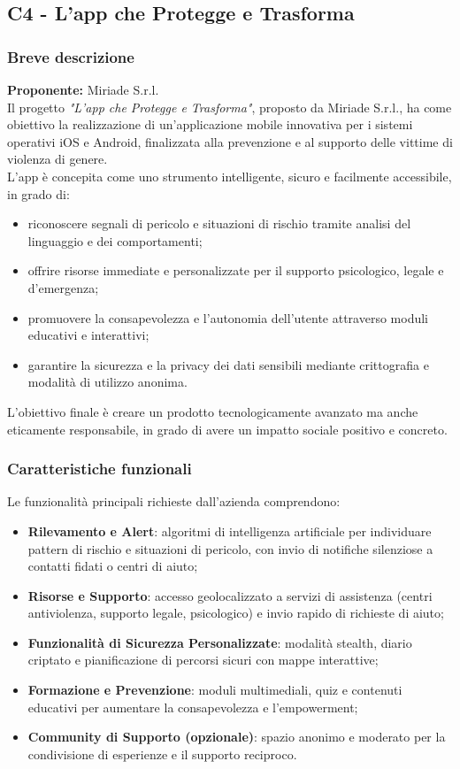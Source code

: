 \documentclass[a4paper,11pt]{article}
\begin{document}
\subsection{C4 - L'app che Protegge e Trasforma}
\subsubsection{Breve descrizione}
\textbf{Proponente:} Miriade S.r.l.
\vspace{0.5em}\\
Il progetto \textit{"L'app che Protegge e Trasforma"}, proposto da Miriade S.r.l., ha come obiettivo la realizzazione di un'applicazione mobile innovativa per i sistemi operativi iOS e Android, finalizzata alla prevenzione e al supporto delle vittime di violenza di genere.\\

L'app è concepita come uno strumento intelligente, sicuro e facilmente accessibile, in grado di:
\begin{itemize}
  \item riconoscere segnali di pericolo e situazioni di rischio tramite analisi del linguaggio e dei comportamenti;
  \item offrire risorse immediate e personalizzate per il supporto psicologico, legale e d'emergenza;
  \item promuovere la consapevolezza e l'autonomia dell'utente attraverso moduli educativi e interattivi;
  \item garantire la sicurezza e la privacy dei dati sensibili mediante crittografia e modalità di utilizzo anonima.
\end{itemize}
L'obiettivo finale è creare un prodotto tecnologicamente avanzato ma anche eticamente responsabile, in grado di avere un impatto sociale positivo e concreto.

\subsubsection{Caratteristiche funzionali}
Le funzionalità principali richieste dall'azienda comprendono:
\begin{itemize}
  \item \textbf{Rilevamento e Alert}: algoritmi di intelligenza artificiale per individuare pattern di rischio e situazioni di pericolo, con invio di notifiche silenziose a contatti fidati o centri di aiuto;
  \item \textbf{Risorse e Supporto}: accesso geolocalizzato a servizi di assistenza (centri antiviolenza, supporto legale, psicologico) e invio rapido di richieste di aiuto;
  \item \textbf{Funzionalità di Sicurezza Personalizzate}: modalità stealth, diario criptato e pianificazione di percorsi sicuri con mappe interattive;
  \item \textbf{Formazione e Prevenzione}: moduli multimediali, quiz e contenuti educativi per aumentare la consapevolezza e l'empowerment;
  \item \textbf{Community di Supporto (opzionale)}: spazio anonimo e moderato per la condivisione di esperienze e il supporto reciproco.
\end{itemize}
\end{document}
